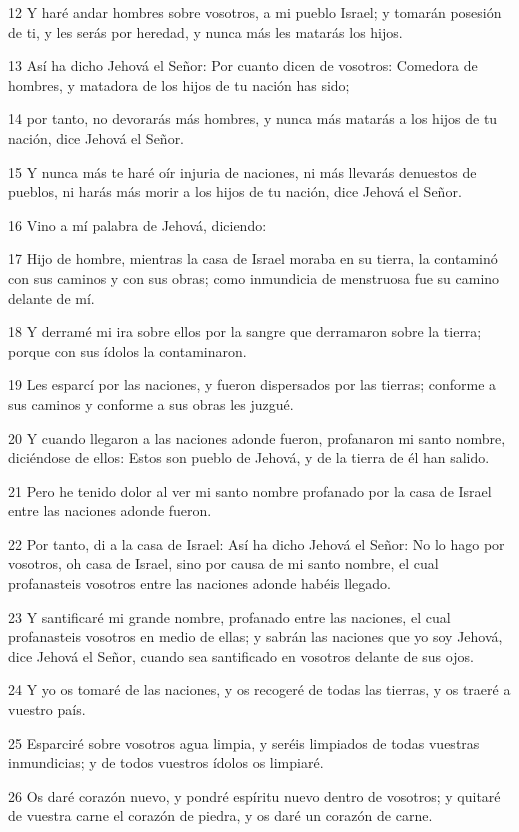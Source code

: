 \par 12 Y haré andar hombres sobre vosotros, a mi pueblo Israel; y tomarán posesión de ti, y les serás por heredad, y nunca más les matarás los hijos.
\par 13 Así ha dicho Jehová el Señor: Por cuanto dicen de vosotros: Comedora de hombres, y matadora de los hijos de tu nación has sido;
\par 14 por tanto, no devorarás más hombres, y nunca más matarás a los hijos de tu nación, dice Jehová el Señor.
\par 15 Y nunca más te haré oír injuria de naciones, ni más llevarás denuestos de pueblos, ni harás más morir a los hijos de tu nación, dice Jehová el Señor.
\par 16 Vino a mí palabra de Jehová, diciendo:
\par 17 Hijo de hombre, mientras la casa de Israel moraba en su tierra, la contaminó con sus caminos y con sus obras; como inmundicia de menstruosa fue su camino delante de mí.
\par 18 Y derramé mi ira sobre ellos por la sangre que derramaron sobre la tierra; porque con sus ídolos la contaminaron.
\par 19 Les esparcí por las naciones, y fueron dispersados por las tierras; conforme a sus caminos y conforme a sus obras les juzgué.
\par 20 Y cuando llegaron a las naciones adonde fueron, profanaron mi santo nombre, diciéndose de ellos: Estos son pueblo de Jehová, y de la tierra de él han salido.
\par 21 Pero he tenido dolor al ver mi santo nombre profanado por la casa de Israel entre las naciones adonde fueron.
\par 22 Por tanto, di a la casa de Israel: Así ha dicho Jehová el Señor: No lo hago por vosotros, oh casa de Israel, sino por causa de mi santo nombre, el cual profanasteis vosotros entre las naciones adonde habéis llegado.
\par 23 Y santificaré mi grande nombre, profanado entre las naciones, el cual profanasteis vosotros en medio de ellas; y sabrán las naciones que yo soy Jehová, dice Jehová el Señor, cuando sea santificado en vosotros delante de sus ojos.
\par 24 Y yo os tomaré de las naciones, y os recogeré de todas las tierras, y os traeré a vuestro país.
\par 25 Esparciré sobre vosotros agua limpia, y seréis limpiados de todas vuestras inmundicias; y de todos vuestros ídolos os limpiaré.
\par 26 Os daré corazón nuevo, y pondré espíritu nuevo dentro de vosotros; y quitaré de vuestra carne el corazón de piedra, y os daré un corazón de carne.
